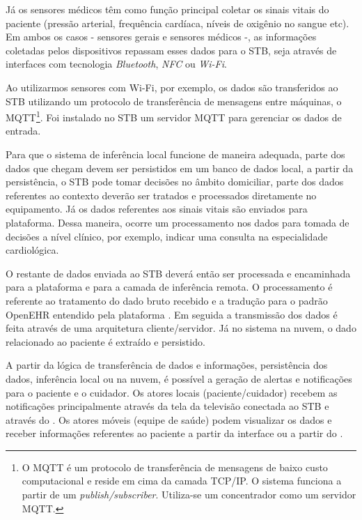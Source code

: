 Já os sensores médicos têm como função principal coletar os sinais vitais do
paciente (pressão arterial, frequência cardíaca, níveis de oxigênio no sangue
etc). Em ambos os casos - sensores gerais e sensores médicos -, as informações
coletadas pelos dispositivos repassam  esses dados para o STB, seja através de
interfaces com tecnologia  \textit{Bluetooth}, \textit{NFC} ou \textit{Wi-Fi}.

Ao utilizarmos sensores com Wi-Fi, por exemplo, os dados são transferidos ao
STB utilizando um protocolo de transferência de mensagens entre máquinas, o
MQTT\footnote{O MQTT é um protocolo de transferência de mensagens de baixo
custo computacional e reside em cima da camada TCP/IP. O sistema funciona a
partir de um \textit{publish/subscriber}. Utiliza-se um concentrador como um
servidor MQTT.}.  Foi instalado no STB um servidor MQTT para gerenciar os dados
de entrada.

Para que o sistema de inferência local funcione de maneira adequada, parte dos
dados que chegam devem ser persistidos em um banco de dados local, a partir da
persistência, o STB pode tomar decisões no âmbito domiciliar, parte dos dados
referentes ao contexto deverão ser tratados e processados diretamente no
equipamento.  Já os dados referentes aos sinais vitais são enviados para
plataforma. Dessa maneira, ocorre um processamento nos dados para tomada de
decisões a nível clínico, por exemplo, indicar uma consulta na especialidade
cardiológica.

O restante de dados enviada ao STB deverá então ser processada e encaminhada
para a plataforma \nextsaude[] e para a camada de inferência remota.  O
processamento é referente ao tratamento do dado bruto recebido e a tradução
para o padrão OpenEHR entendido pela plataforma \nextsaude[]. Em seguida a
transmissão dos dados é feita através de uma arquitetura  cliente/servidor. Já
no sistema na nuvem, o dado relacionado ao paciente é extraído e persistido.

A partir da lógica de transferência de dados e informações, persistência
dos dados, inferência local ou na nuvem, é possível a geração de alertas e
notificações para o paciente e o cuidador. Os atores locais (paciente/cuidador) 
recebem as notificações principalmente através da tela da televisão conectada ao 
STB e através do \smartphone. Os atores móveis (equipe de saúde) podem visualizar 
os dados e receber informações referentes ao paciente a partir da interface \web ou 
a partir do \smartphone.


